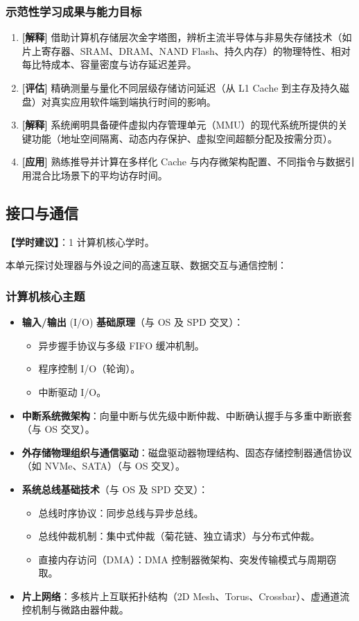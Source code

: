 \subsubsection{示范性学习成果与能力目标}
\begin{enumerate}
    \item \textbf{[解释]} 借助计算机存储层次金字塔图，辨析主流半导体与非易失存储技术（如片上寄存器、SRAM、DRAM、NAND Flash、持久内存）的物理特性、相对每比特成本、容量密度与访存延迟差异。
    \item \textbf{[评估]} 精确测量与量化不同层级存储访问延迟（从 L1 Cache 到主存及持久磁盘）对真实应用软件端到端执行时间的影响。
    \item \textbf{[解释]} 系统阐明具备硬件虚拟内存管理单元（MMU）的现代系统所提供的关键功能（地址空间隔离、动态内存保护、虚拟空间超额分配及按需分页）。
    \item \textbf{[应用]} 熟练推导并计算在多样化 Cache 与内存微架构配置、不同指令与数据引用混合比场景下的平均访存时间。
\end{enumerate}

\subsection{接口与通信}
\textbf{【学时建议】}：1 计算机核心学时。

本单元探讨处理器与外设之间的高速互联、数据交互与通信控制：

\subsubsection{计算机核心主题}
\begin{itemize}
    \item \textbf{输入/输出} (I/O) \textbf{基础原理}（与 OS 及 SPD 交叉）：
    \begin{itemize}
        \item 异步握手协议与多级 FIFO 缓冲机制。
        \item 程序控制 I/O（轮询）。
        \item 中断驱动 I/O。
    \end{itemize}
    \item \textbf{中断系统微架构}：向量中断与优先级中断仲裁、中断确认握手与多重中断嵌套（与 OS 交叉）。
    \item \textbf{外存储物理组织与通信驱动}：磁盘驱动器物理结构、固态存储控制器通信协议（如 NVMe、SATA）（与 OS 交叉）。
    \item \textbf{系统总线基础技术}（与 OS 及 SPD 交叉）：
    \begin{itemize}
        \item 总线时序协议：同步总线与异步总线。
        \item 总线仲裁机制：集中式仲裁（菊花链、独立请求）与分布式仲裁。
        \item 直接内存访问（DMA）：DMA 控制器微架构、突发传输模式与周期窃取。
    \end{itemize}
    \item \textbf{片上网络}：多核片上互联拓扑结构（2D Mesh、Torus、Crossbar）、虚通道流控机制与微路由器仲裁。
\end{itemize}

